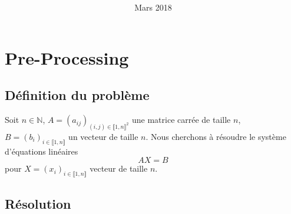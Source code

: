 \documentclass[11pt, a4paper]{article}
\title{
\LARGE{\textbf{\hmwkClass}}\\
\vspace{0.5in}
\large{\textbf{\hmwkTitle}}
\vspace{3in}
}
\author{\textbf{\hmwkAuthorName}}
\date{Mars 2018} %
\begin{document}
\maketitle



\newpage
\tableofcontents
\newpage



\section{Pre-Processing}

\subsection{Définition du problème}

Soit $n \in \mathds{N}$, $A = (a_{ij})_{(i,j)\in \llbracket 1,n \rrbracket^2}$ une matrice carrée de taille $n$, $B = (b_{i})_{i\in \llbracket 1,n \rrbracket}$ un vecteur de taille $n$.
Nous cherchons à résoudre le système d'équations linéaires
\begin{equation} \label{eq:problem}
    AX=B
\end{equation}
pour $X = (x_{i})_{i\in \llbracket 1,n \rrbracket}$ vecteur de taille $n$.

\subsection{Résolution}
\end{document}
